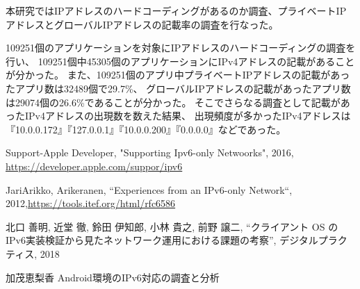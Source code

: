 \documentclass[twocolumn, 10pt, a4paper]{jarticle}
\begin{document}
本研究ではIPアドレスのハードコーディングがあるのか調査、プライベートIPアドレスとグローバルIPアドレスの記載率の調査を行なった。

109251個のアプリケーションを対象にIPアドレスのハードコーディングの調査を行い、
109251個中45305個のアプリケーションにIPv4アドレスの記載があることが分かった。
また、109251個のアプリ中プライベートIPアドレスの記載があったアプリ数は32489個で29.7\%、
グローバルIPアドレスの記載があったアプリ数は29074個の26.6\%であることが分かった。
そこでさらなる調査として記載があったIPv4アドレスの出現数を数えた結果、
出現頻度が多かったIPv4アドレスは『10.0.0.172』『127.0.0.1』『10.0.0.200』『0.0.0.0』などであった。






\begin{thebibliography}{20}

Support-Apple Developer, "Supporting Ipv6-only Netwoorks", 2016, \url{https://developer.apple.com/suppor/ipv6}

JariArikko, Arikeranen, “Experiences from an IPv6-only Network“, 2012,\url{https://tools.itef.org/html/rfc6586}

北口 善明, 近堂 徹, 鈴田 伊知郎, 小林 貴之, 前野 譲二, “クライアント OS の IPv6実装検証から見たネットワーク運用における課題の考察”, デジタルプラクティス, 2018

加茂恵梨香 Android環境のIPv6対応の調査と分析

\end{thebibliography}
\end{document}
